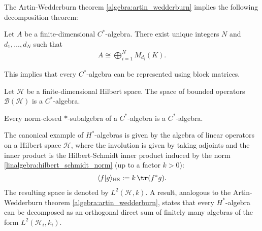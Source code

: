     The Artin-Wedderburn theorem \ref{algebra:artin_wedderburn} implies the following decomposition theorem:
    \begin{theorem}
        Let $A$ be a finite-dimensional $C^*$-algebra. There exist unique integers $N$ and $d_1,\ldots,d_N$ such that
        \begin{gather}
            A\cong\bigoplus_{i=1}^NM_{d_i}(K).
        \end{gather}
    \end{theorem}
    This implies that every $C^*$-algebra can be represented using block matrices.

    \begin{example}
        Let $\mathcal{H}$ be a finite-dimensional Hilbert space. The space of bounded operators $\mathcal{B}(\mathcal{H})$ is a $C^*$-algebra.
    \end{example}

    \begin{property}
        Every norm-closed $\ast$-subalgebra of a $C^*$-algebra is a $C^*$-algebra.
    \end{property}

    \begin{example}\label{operators:hilbert_schmidt_inner_product}
        The canonical example of $H^*$-algebras is given by the algebra of linear operators on a Hilbert space $\mathcal{H}$, where the involution is given by taking adjoints and the inner product is the Hilbert-Schmidt inner product induced by the norm \ref{linalgebra:hilbert_schmidt_norm} (up to a factor $k>0$):
        \begin{gather}
            \langle f|g \rangle_\text{HS} := k\,\tr(f^*g).
        \end{gather}
        The resulting space is denoted by $L^2(\mathcal{H},k)$. A result, analogous to the Artin-Wedderburn theorem \ref{algebra:artin_wedderburn}, states that every $H^*$-algebra can be decomposed as an orthogonal direct sum of finitely many algebras of the form $L^2(\mathcal{H}_i,k_i)$.
    \end{example}


